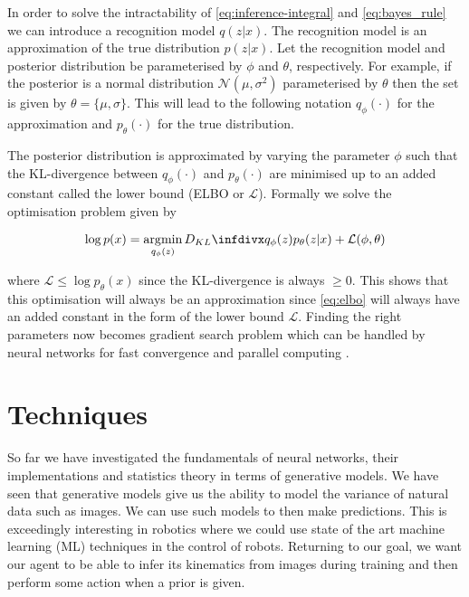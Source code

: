 \documentclass[main.tex]{subfiles}
\begin{document}
In order to solve the intractability of \eqref{eq:inference-integral} and \eqref{eq:bayes_rule} we can introduce a recognition model $q(z|x)$. The recognition model is an approximation of the true distribution $p(z|x)$. Let the recognition model and posterior distribution be parameterised by $\phi$ and $\theta$, respectively. For example, if the posterior is a normal distribution $\mathcal{N}(\mu,\sigma^2)$ parameterised by $\theta$ then the set is given by $\theta = \{\mu, \sigma\}$. This will lead to the following notation $q_\phi ( \cdot)$ for the approximation and $p_\theta (\cdot)$ for the true distribution.

The posterior distribution is approximated by varying the parameter $\phi$ such that the KL-divergence between $q_\phi(\cdot)$ and $p_\theta(\cdot)$ are minimised up to an added constant called the lower bound (ELBO or $\mathcal{L}$). Formally we solve the optimisation problem given by

\begin{equation}
\label{eq:elbo}
  \log p(x) = \argmin_{q_{\phi}(z)} D_{KL}\infdiv{q_\phi(z)}{p_\theta(z|x)} + \mathcal{L}(\phi,\theta)
\end{equation}

where $\mathcal{L} \leq \log p_\theta(x)$ since the KL-divergence is always $ \geq 0$. This shows that this optimisation will always be an approximation since \eqref{eq:elbo} will always have an added constant in the form of the lower bound $\mathcal{L}$. Finding the right parameters now becomes gradient search problem which can be handled by neural networks for fast convergence and parallel computing \cite{rezende2014stochastic,kingma2013auto}. 

\chapter{Techniques}
So far we have investigated the fundamentals of neural networks, their implementations and statistics theory in terms of generative models. We have seen that generative models give us the ability to model the variance of natural data such as images. We can use such models to then make predictions. This is exceedingly interesting in robotics where we could use state of the art machine learning (ML) techniques in the control of robots. Returning to our goal, we want our agent to be able to infer its kinematics from images during training and then perform some action when a prior is given.
\end{document}
